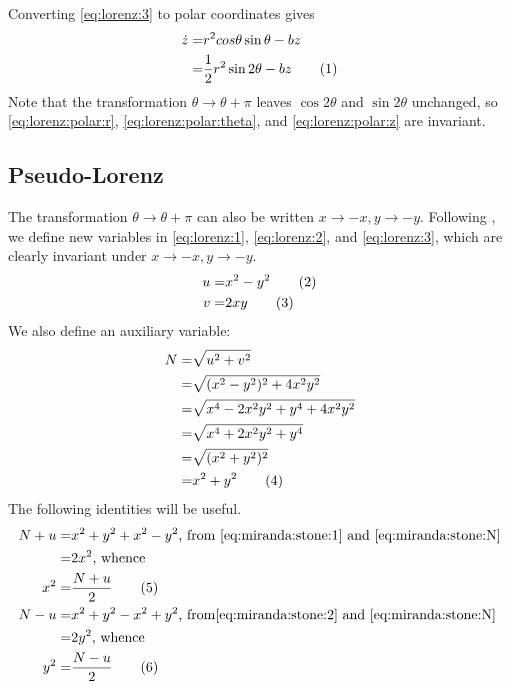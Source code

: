 \documentclass[]{article}
\newcommand\numberthis{\addtocounter{equation}{1}\tag{\theequation}}
\begin{document}
Converting \eqref{eq:lorenz:3} to polar coordinates gives
\begin{align*}
	\dot{z} =& r^2 cos\theta \sin\theta - b z\\
	=& \frac{1}{2} r^2 \sin 2\theta -bz \numberthis \label{eq:lorenz:polar:z}
\end{align*}
Note that the transformation $\theta \rightarrow \theta + \pi$ leaves $\cos 2 \theta$ and $\sin 2\theta$ unchanged, so \eqref{eq:lorenz:polar:r}, \eqref{eq:lorenz:polar:theta}, and \eqref{eq:lorenz:polar:z} are invariant.

\subsection{Pseudo-Lorenz}

The transformation $\theta \rightarrow \theta + \pi$ can also be written $x \rightarrow -x, y \rightarrow -y$. Following \cite{miranda1993proto}, we define new variables in \eqref{eq:lorenz:1},  \eqref{eq:lorenz:2}, and \eqref{eq:lorenz:3}, which are clearly invariant under $x \rightarrow -x, y \rightarrow -y$.
\begin{align*}
	u =& x^2-y^2 \numberthis \label{eq:miranda:stone:1}\\
	v =& 2 x y\numberthis \label{eq:miranda:stone:2}
\end{align*}
We also define an auxiliary variable:
\begin{align*}
	N =& \sqrt{u^2+v^2}\\
	=& \sqrt{(x^2-y^2)^2 + 4x^2y^2}\\
	=& \sqrt{x^4 - 2 x^2 y^2 + y^4  + 4x^2y^2}\\
	=& \sqrt{x^4 + 2 x^2 y^2 + y^4}\\
	=& \sqrt{(x^2+y^2)^2}\\
	=& x^2+y^2 \numberthis \label{eq:miranda:stone:N}
\end{align*}
The following identities will be useful.
\begin{align*}
	N+u= & x^2+y^2 + x^2 - y^2 \text{, from \eqref{eq:miranda:stone:1} and \eqref{eq:miranda:stone:N}} \\
	=& 2 x^2 \text{, whence}\\
	x^2 =& \frac{N+u}{2}\numberthis \label{eq:miranda:stone:x}\\
	N - u =& x^2+y^2 - x^2 + y^2 \text{, from\eqref{eq:miranda:stone:2} and \eqref{eq:miranda:stone:N}}\\
	=& 2 y^2 \text{, whence}\\
	y^2 =& \frac{N-u}{2}\numberthis \label{eq:miranda:stone:y}	
\end{align*}
\end{document}

